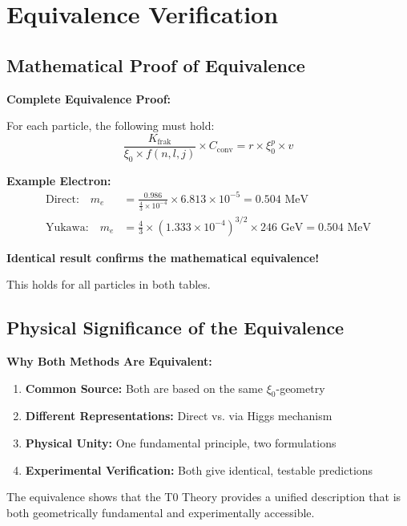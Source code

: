\documentclass[12pt,a4paper]{article}
\begin{document}
	\section{Equivalence Verification}
	
	\subsection{Mathematical Proof of Equivalence}
	
	\begin{equivalence}
		\textbf{Complete Equivalence Proof:}
		
		For each particle, the following must hold:
		\begin{equation}
			\frac{K_{\text{frak}}}{\xi_0 \times f(n,l,j)} \times C_{\text{conv}} = r \times \xi_0^p \times v
		\end{equation}
		
		\textbf{Example Electron:}
		\begin{align}
			\text{Direct:} \quad m_e &= \frac{0.986}{\frac{4}{3} \times 10^{-4}} \times 6.813 \times 10^{-5} = 0.504 \text{ MeV} \\
			\text{Yukawa:} \quad m_e &= \frac{4}{3} \times (1.333 \times 10^{-4})^{3/2} \times 246 \text{ GeV} = 0.504 \text{ MeV}
		\end{align}
		
		\textbf{Identical result confirms the mathematical equivalence!}
		
		This holds for all particles in both tables.
	\end{equivalence}
	
	\subsection{Physical Significance of the Equivalence}
	
	\begin{keyresult}
		\textbf{Why Both Methods Are Equivalent:}
		
		\begin{enumerate}
			\item \textbf{Common Source:} Both are based on the same $\xi_0$-geometry
			
			\item \textbf{Different Representations:} Direct vs. via Higgs mechanism
			
			\item \textbf{Physical Unity:} One fundamental principle, two formulations
			
			\item \textbf{Experimental Verification:} Both give identical, testable predictions
		\end{enumerate}
		
		The equivalence shows that the T0 Theory provides a unified description that is both geometrically fundamental and experimentally accessible.
	\end{keyresult}
	
\end{document}
